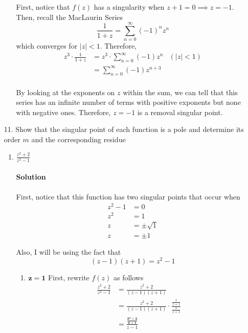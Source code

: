 \documentclass[11pt]{article}
\begin{document}
\begin{enumerate}
\begin{enumerate}
		First, notice that $f(z)$ has a singularity when $z + 1 = 0 \implies z = -1$. Then, recall the MacLaurin Series
		\[
		\frac{1}{1 + z} = \sum^{\infty}_{n=0} (-1)^n z^n
		\]
		which converges for $|z| < 1$. Therefore,
		\[\begin{aligned}
		z^3 \cdot \frac{1}{1 + z}
		&= z^3 \cdot \sum^{\infty}_{n=0} (-1)z^n & (|z| < 1) \\
		&= \sum^{\infty}_{n=0} (-1)z^{n + 3} \\
		\end{aligned}\]
		
		By looking at the exponents on $z$ within the sum, we can tell that this series has an infinite number of terms with positive exponents but none with negative ones. Therefore, $z = -1$ is a removal singular point.
	\end{enumerate}
	
	\item[11.] Show that the singular point of each function is a pole and determine its order $m$ and the corresponding residue
	
	\begin{enumerate}
		\item $\frac{z^2 + 2}{z^2 - 1}$
		
		\paragraph{Solution} First, notice that this function has two singular points that occur when
		\[\begin{aligned}
			z^2 - 1 &= 0 \\
			z^2 &= 1 \\
			z &= \pm \sqrt{1} \\
			z &= \pm 1
		\end{aligned}\]
		
		Also, I will be using the fact that
		\[(z - 1)(z + 1) = z^2 - 1\]
		
		\begin{enumerate}
			\item $\mathbf{z = 1}$
			First, rewrite $f(z)$ as follows
			\[\begin{aligned}
			\frac{z^2 + 2}{z^2 - 1}
			&= \frac{z^2 + 2}{(z - 1)(z + 1)} \\
			&= \frac{z^2 + 2}{(z - 1)(z + 1)} \cdot
				\frac{\frac{1}{z + 1}}{\frac{1}{z + 1}} \\
			&= \frac{ \mathbf{\frac{z^2 + 2}{z + 1}} }{z - 1} \\
			\end{aligned}\]
			

\end{enumerate}
\end{enumerate}
\end{enumerate}
\end{document}
